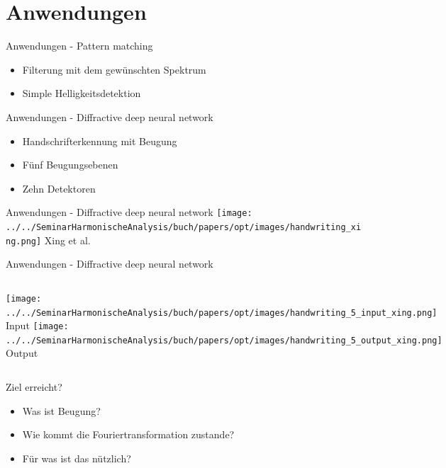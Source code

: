 \documentclass{beamer}
\begin{document}
\section{Anwendungen}

\begin{frame}{Anwendungen - Pattern matching}
    \begin{itemize}
        \item Filterung mit dem gewünschten Spektrum
        \item Simple Helligkeitsdetektion
    \end{itemize}
\end{frame}

\begin{frame}{Anwendungen - Diffractive deep neural network}
    \begin{itemize}
        \item Handschrifterkennung mit Beugung
        \item Fünf Beugungsebenen
        \item Zehn Detektoren
    \end{itemize}
\end{frame}

\begin{frame}{Anwendungen - Diffractive deep neural network}
    \centering
    \texttt{[image: ../../SeminarHarmonischeAnalysis/buch/papers/opt/images/handwriting\_xing.png]}
    Xing et al. \cite{opt:Lin.2018}
\end{frame}

\begin{frame}{Anwendungen - Diffractive deep neural network}
    \begin{columns}
        \texttt{[image: ../../SeminarHarmonischeAnalysis/buch/papers/opt/images/handwriting\_5\_input\_xing.png]}
        Input
        \texttt{[image: ../../SeminarHarmonischeAnalysis/buch/papers/opt/images/handwriting\_5\_output\_xing.png]}
        Output
    \end{columns}
\end{frame}

\begin{frame}{Ziel erreicht?}
    \begin{itemize}
        \item Was ist Beugung?
        \item Wie kommt die Fouriertransformation zustande?
        \item Für was ist das nützlich?
    \end{itemize}
\end{frame}
\end{document}
